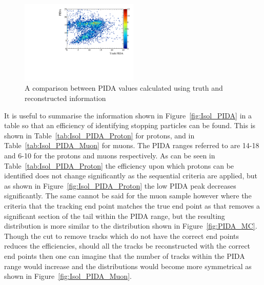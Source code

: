 \begin{figure}[h!]
  \centering
  \includegraphics[width=0.5\textwidth]{IsolatedProtons_500V_Dec16_Proton_MCPIDA_PIDA}
  \caption[A comparison between PIDA values calculated using truth and reconstructed information]
          {A comparison between PIDA values calculated using truth and reconstructed information}
  \label{fig:MCPIDA}
\end{figure}

It is useful to summarise the information shown in Figure~\ref{fig:Isol_PIDA} in a table so that an efficiency of identifying stopping particles can be found. This is shown in Table~\ref{tab:Isol_PIDA_Proton} for protons, and in Table~\ref{tab:Isol_PIDA_Muon} for muons. The PIDA ranges referred to are 14-18 and 6-10 for the protons and muons respectively. As can be seen in Table~\ref{tab:Isol_PIDA_Proton} the efficiency upon which protons can be identified does not change significantly as the sequential criteria are applied, but as shown in Figure~\ref{fig:Isol_PIDA_Proton} the low PIDA peak decreases significantly. The same cannot be said for the muon sample however where the criteria that the tracking end point matches the true end point as that removes a significant section of the tail within the PIDA range, but the resulting distribution is more similar to the distribution shown in Figure~\ref{fig:PIDA_MC}. Though the cut to remove tracks which do not have the correct end points reduces the efficiencies, should all the tracks be reconstructed with the correct end points then one can imagine that the number of tracks within the PIDA range would increase and the distributions would become more symmetrical as shown in Figure~\ref{fig:Isol_PIDA_Muon}. \\

